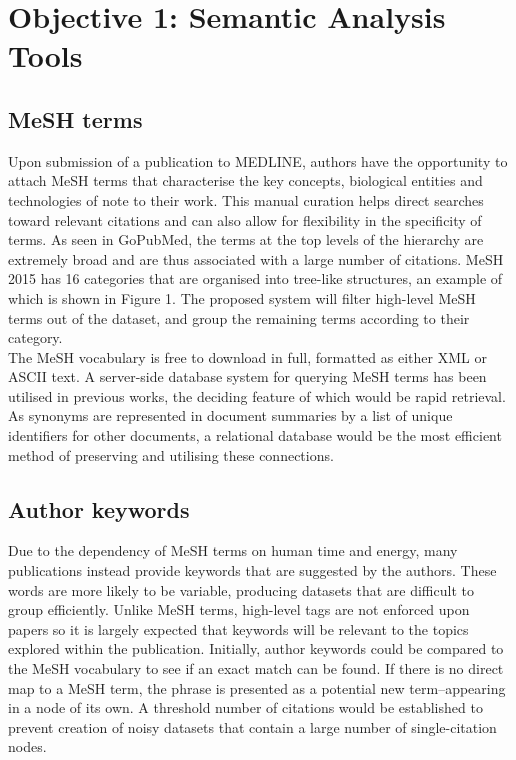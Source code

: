 \documentclass[PROP_AGutteridge_CS.tex]{subfiles}
\begin{document}
\section{Objective 1: Semantic Analysis Tools}
\subsection{MeSH terms}
Upon submission of a publication to MEDLINE, authors have the opportunity to attach MeSH terms that characterise the key concepts, biological entities and technologies of note to their work. This manual curation helps direct searches toward relevant citations and can also allow for flexibility in the specificity of terms. As seen in GoPubMed, the terms at the top levels of the hierarchy are extremely broad and are thus associated with a large number of citations. MeSH 2015 has 16 categories\cite{mesh2015} that are organised into tree-like structures, an example of which is shown in Figure 1. The proposed system will filter high-level MeSH terms out of the dataset, and group the remaining terms according to their category.\\

\noindent The MeSH vocabulary is free to download in full, formatted as either XML or ASCII text. A server-side database system for querying MeSH terms has been utilised in previous works\cite{stoyanovich}, the deciding feature of which would be rapid retrieval. As synonyms are represented in document summaries by a list of unique identifiers for other documents, a relational database would be the most efficient method of preserving and utilising these connections. 
	
\subsection{Author keywords}
Due to the dependency of MeSH terms on human time and energy, many publications instead provide keywords that are suggested by the authors. These words are more likely to be variable, producing datasets that are difficult to group efficiently. Unlike MeSH terms, high-level tags are not enforced upon papers so it is largely expected that keywords will be relevant to the topics explored within the publication. Initially, author keywords could be compared to the MeSH vocabulary to see if an exact match can be found. If there is no direct map to a MeSH term, the phrase is presented as a potential new term--appearing in a node of its own. A threshold number of citations would be established to prevent creation of noisy datasets that contain a large number of single-citation nodes. 
\end{document}
